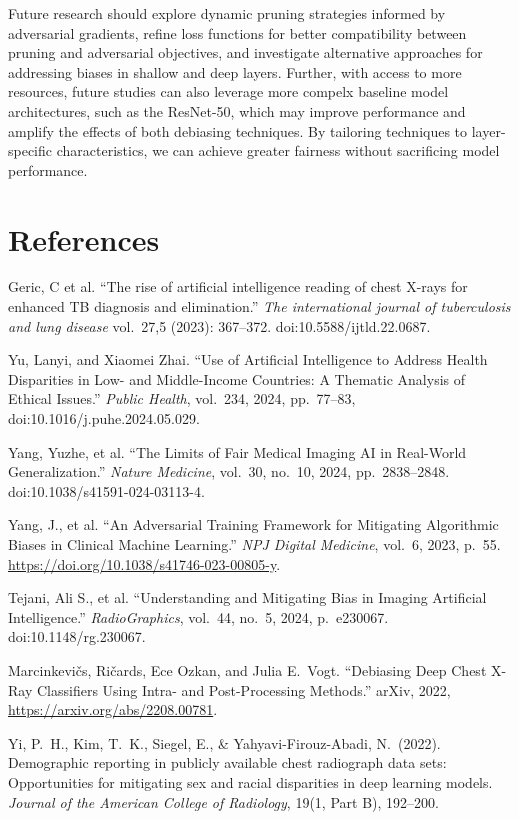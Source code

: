 \documentclass[11pt]{article}
\begin{document}
Future research should explore dynamic pruning strategies informed by adversarial gradients, refine loss functions for better compatibility between pruning and adversarial objectives, and investigate alternative approaches for addressing biases in shallow and deep layers. Further, with access to more resources, future studies can also leverage more compelx baseline model architectures, such as the ResNet-50, which may improve performance and amplify the effects of both debiasing techniques. By tailoring techniques to layer-specific characteristics, we can achieve greater fairness without sacrificing model performance.


\section*{References}

\noindent
[1] Geric, C et al. ``The rise of artificial intelligence reading of chest X-rays for enhanced TB diagnosis and elimination.'' \textit{The international journal of tuberculosis and lung disease} vol.\ 27,5 (2023): 367--372. doi:10.5588/ijtld.22.0687.

\bigskip\noindent
[2] Yu, Lanyi, and Xiaomei Zhai. ``Use of Artificial Intelligence to Address Health Disparities in Low- and Middle-Income Countries: A Thematic Analysis of Ethical Issues.'' \textit{Public Health}, vol.\ 234, 2024, pp.\ 77--83, doi:10.1016/j.puhe.2024.05.029.

\bigskip\noindent
[3] Yang, Yuzhe, et al. ``The Limits of Fair Medical Imaging AI in Real-World Generalization.'' \textit{Nature Medicine}, vol.\ 30, no.\ 10, 2024, pp.\ 2838--2848. doi:10.1038/s41591-024-03113-4.

\bigskip\noindent
[4] Yang, J., et al. ``An Adversarial Training Framework for Mitigating Algorithmic Biases in Clinical Machine Learning.'' \textit{NPJ Digital Medicine}, vol.\ 6, 2023, p.\ 55. \url{https://doi.org/10.1038/s41746-023-00805-y}.

\bigskip\noindent
[5] Tejani, Ali S., et al. ``Understanding and Mitigating Bias in Imaging Artificial Intelligence.'' \textit{RadioGraphics}, vol.\ 44, no.\ 5, 2024, p.\ e230067. doi:10.1148/rg.230067.

\bigskip\noindent
[6] Marcinkevi\v{c}s, Ri\v{c}ards, Ece Ozkan, and Julia E.\ Vogt. ``Debiasing Deep Chest X-Ray Classifiers Using Intra- and Post-Processing Methods.'' arXiv, 2022, \url{https://arxiv.org/abs/2208.00781}.

\bigskip\noindent
[7] Yi, P.\ H., Kim, T.\ K., Siegel, E., \& Yahyavi-Firouz-Abadi, N.\ (2022). Demographic reporting in publicly available chest radiograph data sets: Opportunities for mitigating sex and racial disparities in deep learning models. \textit{Journal of the American College of Radiology}, 19(1, Part B), 192--200.
\end{document}
